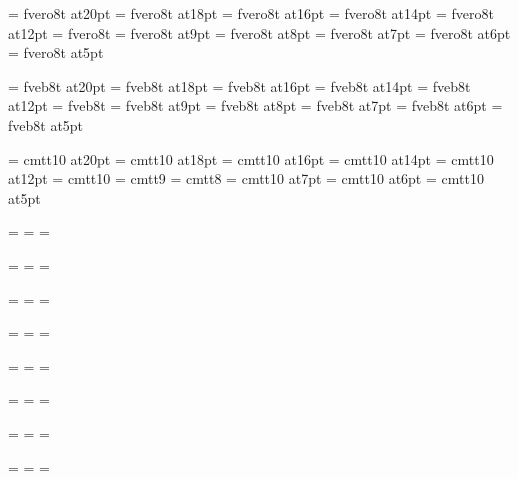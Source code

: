 \font\twentysl=     fvero8t at20pt
\font\eighteensl=   fvero8t at18pt
\font\sixteensl=    fvero8t at16pt
\font\fourteensl=   fvero8t at14pt
\font\twelvesl=     fvero8t at12pt
\font\tensl=        fvero8t
\font\ninesl=       fvero8t at9pt
\font\eightsl=      fvero8t at8pt
\font\sevensl=      fvero8t at7pt
\font\sixsl=        fvero8t at6pt
\font\fivesl=       fvero8t at5pt

\font\twentybf=     fveb8t at20pt
\font\eighteenbf=   fveb8t at18pt
\font\sixteenbf=    fveb8t at16pt
\font\fourteenbf=   fveb8t at14pt
\font\twelvebf=     fveb8t at12pt
\font\tenbf=        fveb8t
\font\ninebf=       fveb8t at9pt
\font\eightbf=      fveb8t at8pt
\font\sevenbf=      fveb8t at7pt
\font\sixbf=        fveb8t at6pt
\font\fivebf=       fveb8t at5pt

\font\twentytt=     cmtt10 at20pt
\font\eighteentt=   cmtt10 at18pt
\font\sixteentt=    cmtt10 at16pt
\font\fourteentt=   cmtt10 at14pt
\font\twelvett=     cmtt10 at12pt
\font\tentt=        cmtt10
\font\ninett=       cmtt9
\font\eighttt=      cmtt8
\font\seventt=      cmtt10 at7pt
\font\sixtt=        cmtt10 at6pt
\font\fivett=       cmtt10 at5pt




=\tenrm
{}=\sevenrm
{}=\fiverm
\def\rm{\fam=0 \tenrm}

=\eleveni
{}=\eighti
{}=\sixi
\def\mit{\fam=1}

=\elevensy
{}=\eightsy
{}=\sixsy
\def\cal{\fam=2}

=\elevenex
{}=\eightex
{}=\sixex


\def\it{\fam=\itfam \tenit}
\textfont\itfam=\tenit
\scriptfont\itfam=\sevenit
\scriptscriptfont\itfam=\fiveit

\def\sl{\fam=\slfam \tensl}
\textfont\slfam=\tensl
\scriptfont\slfam=\sevensl
\scriptscriptfont\slfam=\fivesl

\def\bf{\fam=\bffam \tenbf}
\textfont\bffam=\tenbf
\scriptfont\bffam=\sevenbf
\scriptscriptfont\bffam=\fivebf

\def\tt{\fam=\ttfam \tentt}
\textfont\ttfam=\tentt
\scriptfont\ttfam=\seventt
\scriptscriptfont\ttfam=\fivett

